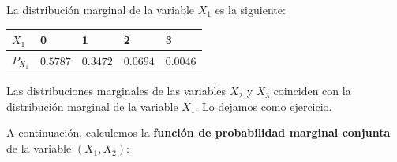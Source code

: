 \documentclass[
  letterpaper,
  DIV=11,
  numbers=noendperiod]{scrreprt}
\begin{document}
La distribución marginal de la variable \(X_1\) es la siguiente:

\begin{longtable}[]{@{}lllll@{}}
\toprule\noalign{}
\(X_1\) & 0 & 1 & 2 & 3 \\
\midrule\noalign{}
\endhead
\bottomrule\noalign{}
\endlastfoot
\(P_{X_1}\) & \(0.5787\) & \(0.3472\) & \(0.0694\) & \(0.0046\) \\
\end{longtable}

Las distribuciones marginales de las variables \(X_2\) y \(X_3\)
coinciden con la distribución marginal de la variable \(X_1\). Lo
dejamos como ejercicio.

A continuación, calculemos la \textbf{función de probabilidad marginal
conjunta} de la variable \((X_1,X_2)\):
\end{document}

